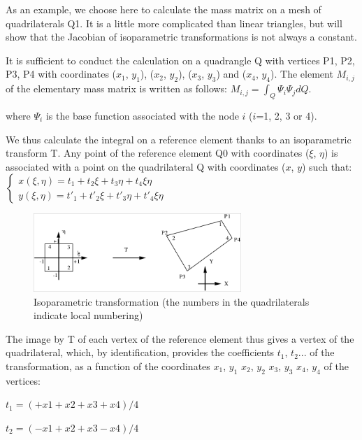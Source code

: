 As an example, we choose here to calculate the mass matrix on a mesh of
quadrilaterals Q1. It is a little more complicated than linear triangles, but
will show that the Jacobian of isoparametric transformations is not always a
constant.

It is sufficient to conduct the calculation on a quadrangle Q with vertices P1,
P2, P3, P4 with coordinates ($x_1$, $y_1$), ($x_2$, $y_2$), ($x_3$, $y_3$) and
($x_4$, $y_4$). The element
$M_{i,j}$ of the elementary mass matrix is written as follows:
$M_{i,j} =\int _{Q}\Psi _{i}  \Psi _{j} dQ$.

where $\Psi _{i}$ is the base function associated with the node $i$ ($i$=1, 2, 3
or 4).

We thus calculate the integral on a reference element thanks to an
isoparametric transform T. Any point of the reference element Q0 with
coordinates ($\xi$, $\eta$) is associated with a point on the quadrilateral Q
with coordinates ($x$, $y$) such that:
$\left\{
  \begin{array}{l}
x(\xi,\eta) = t_{1} + t_{2}\xi + t_{3}\eta + t_{4}\xi\eta \\
y(\xi,\eta) = t'_{1} + t'_{2}\xi + t'_{3}\eta + t'_{4}\xi\eta
\end{array}\right.$

\begin{figure}[H]%
\begin{center}
%
  \includegraphics[width=0.7\textwidth]{./graphics/isoparametric}
%
\end{center}
\caption{Isoparametric transformation (the numbers in the quadrilaterals
indicate local numbering)}
\label{fig:isoparametric}
\end{figure}

The image by T of each vertex of the reference element thus gives a vertex of
the quadrilateral, which, by identification, provides the coefficients $t_1$,
$t_2$... of the transformation, as a function of the coordinates $x_1$, $y_1$
$x_2$, $y_2$    $x_3$, $y_3$    $x_4$, $y_4$    of the vertices:

$t_{1} = ( +x1 + x2 + x3 + x4 ) / 4$

$t_{2} = ( -x1 + x2 + x3 - x4 ) / 4$

